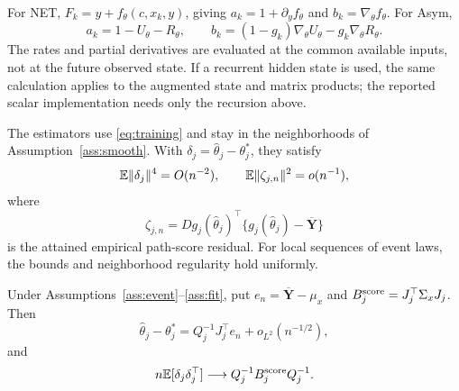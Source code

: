 For NET, $F_k=y+f_\theta(c,x_k,y)$, giving $a_k=1+\partial_yf_\theta$ and $b_k=\nabla_\theta f_\theta$. For Asym,
\[
 a_k=1-U_\theta-R_\theta,\qquad
 b_k=(1-g_k)\nabla_\theta U_\theta-g_k\nabla_\theta R_\theta.
\]
The rates and partial derivatives are evaluated at the common available inputs, not at the future observed state. If a recurrent hidden state is used, the same calculation applies to the augmented state and matrix products; the reported scalar implementation needs only the recursion above.

\begin{assumption}
\label{ass:fit}
The estimators use \eqref{eq:training} and stay in the neighborhoods of Assumption~\ref{ass:smooth}. With $\delta_j=\widehat\theta_j-\theta_j^*$, they satisfy
\[
 \mathbb E\|\delta_j\|^4=O(n^{-2}),\qquad
 \mathbb E\|\zeta_{j,n}\|^2=o(n^{-1}),
\]
where
\[
 \zeta_{j,n}=Dg_j(\widehat\theta_j)^\top
       \{g_j(\widehat\theta_j)-\overline{\mathbf Y}\}
\]
is the attained empirical path-score residual. For local sequences of event laws, the bounds and neighborhood regularity hold uniformly.
\end{assumption}

\begin{lemma}
\label{lem:influence}
Under Assumptions~\ref{ass:event}--\ref{ass:fit}, put $e_n=\overline{\mathbf Y}-\mu_x$ and $B_j^{\rm score}=J_j^\top\Sigma_xJ_j$. Then
\begin{equation}
 \widehat\theta_j-\theta_j^*
 =Q_j^{-1}J_j^\top e_n+o_{L^2}(n^{-1/2}),
 \label{eq:influence}
\end{equation}
and
\[
 n\mathbb E[\delta_j\delta_j^\top]
 \longrightarrow Q_j^{-1}B_j^{\rm score}Q_j^{-1}.
\]
\end{lemma}

